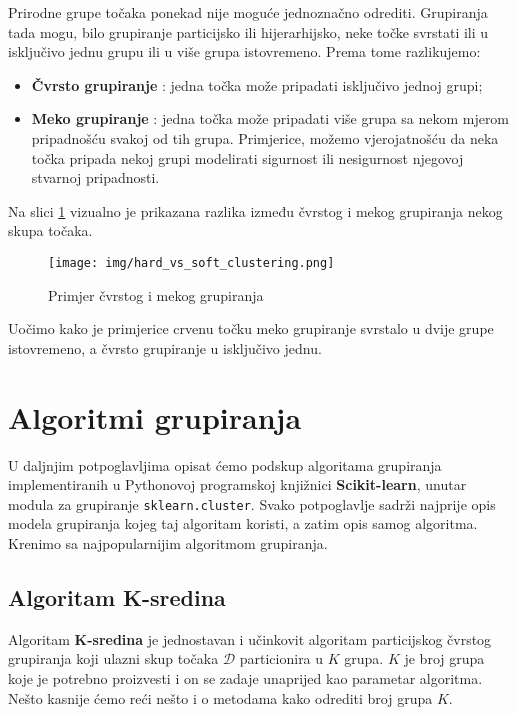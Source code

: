 \documentclass[times, utf8, zavrsni]{fer}
\begin{document}
Prirodne grupe točaka ponekad nije moguće jednoznačno odrediti. Grupiranja tada mogu, bilo grupiranje particijsko ili hijerarhijsko, neke točke svrstati ili u isključivo jednu grupu ili u više grupa istovremeno. Prema tome razlikujemo:
\begin{itemize}
    \item \textbf{Čvrsto grupiranje} : jedna točka može pripadati isključivo jednoj grupi;
    \item \textbf{Meko grupiranje} : jedna točka može pripadati više grupa sa nekom mjerom pripadnošću svakoj od tih grupa. Primjerice, možemo vjerojatnošću da neka točka pripada nekoj grupi modelirati sigurnost ili nesigurnost njegovoj stvarnoj pripadnosti.
\end{itemize}
Na slici \ref{fig:hard_vs_soft_clustering} vizualno je prikazana razlika između čvrstog i mekog grupiranja nekog skupa točaka. 
\begin{figure}[H]
    \centering
    \texttt{[image: img/hard\_vs\_soft\_clustering.png]}
    \caption{Primjer čvrstog i mekog grupiranja}
    \label{fig:hard_vs_soft_clustering}
\end{figure} Uočimo kako je primjerice crvenu točku meko grupiranje svrstalo u dvije grupe istovremeno, a čvrsto grupiranje u isključivo jednu.

\chapter{Algoritmi grupiranja}
U daljnjim potpoglavljima opisat ćemo podskup algoritama grupiranja implementiranih u Pythonovoj programskoj knjižnici \textbf{Scikit-learn}, unutar modula za grupiranje \texttt{sklearn.cluster}. Svako potpoglavlje sadrži najprije opis modela grupiranja kojeg taj algoritam koristi, a zatim opis samog algoritma. Krenimo sa najpopularnijim algoritmom grupiranja.
\section{Algoritam K-sredina} \label{kmeans}
Algoritam \textbf{K-sredina}  je jednostavan i učinkovit algoritam particijskog čvrstog grupiranja koji ulazni skup točaka $\mathcal{D}$ particionira u $K$ grupa. $K$ je broj grupa koje je potrebno proizvesti i on se zadaje unaprijed kao parametar algoritma. Nešto kasnije ćemo reći nešto i o metodama kako odrediti broj grupa $K$.
\end{document}
